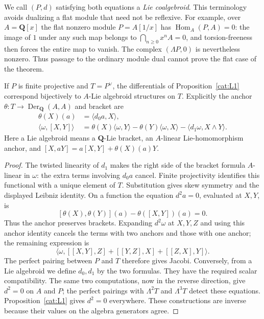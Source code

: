 We call $(P,d)$ satisfying both equations a \emph{Lie coalgebroid}.
This terminology avoids dualizing a flat module that need not be reflexive.
For example, over $A=\mathbf Q[x]$ the flat nonzero module $P=A[1/x]$
has $\operatorname{Hom}_A(P,A)=0$: the image of $1$ under any such map
belongs to $\bigcap_{n\geq0}x^nA=0$, and torsion-freeness then forces the
entire map to vanish.  The complex $(\Lambda P,0)$ is nevertheless
nonzero.  Thus passage to the ordinary module dual cannot prove the
flat case of the theorem.

\begin{proposition}\label{cat:L2}
If $P$ is finite projective and $T=P^\vee$, the differentials of
Proposition~\ref{cat:L1} correspond bijectively to $A$-Lie algebroid
structures on $T$.  Explicitly the anchor
$\theta:T\to\operatorname{Der}_{\mathbf Q}(A,A)$ and bracket are
\begin{align*}
 \theta(X)(a)&=\langle d_0a,X\rangle,\\
 \langle\omega,[X,Y]\rangle
 &=\theta(X)\langle\omega,Y\rangle
   -\theta(Y)\langle\omega,X\rangle
   -\langle d_1\omega,X\wedge Y\rangle.
\end{align*}
Here a Lie algebroid means a $\mathbf Q$-Lie bracket, an $A$-linear
Lie-homomorphism anchor, and
$[X,aY]=a[X,Y]+\theta(X)(a)Y$.
\end{proposition}
\begin{proof}
The twisted linearity of $d_1$ makes the right side of the bracket
formula $A$-linear in $\omega$: the extra terms involving $d_0a$ cancel.
Finite projectivity identifies this functional with a unique element of
$T$.  Substitution gives skew symmetry and the displayed Leibniz
identity.  On a function the equation $d^2a=0$, evaluated at $X,Y$, is
\[
 [\theta(X),\theta(Y)](a)-\theta([X,Y])(a)=0.
\]
Thus the anchor preserves brackets.  Expanding $d^2\omega$ at $X,Y,Z$
and using this anchor identity cancels the terms with two anchors and
those with one anchor; the remaining expression is
\[
 \langle\omega,
 [[X,Y],Z]+[[Y,Z],X]+[[Z,X],Y]\rangle.
\]
The perfect pairing between $P$ and $T$ therefore gives Jacobi.
Conversely, from a Lie algebroid we define $d_0,d_1$ by the two formulas.
They have the required scalar compatibility.  The same two computations,
now in the reverse direction, give $d^2=0$ on $A$ and $P$; the perfect
pairings with $\Lambda^2T$ and $\Lambda^3T$ detect these equations.
Proposition~\ref{cat:L1} gives $d^2=0$ everywhere.  These constructions
are inverse because their values on the algebra generators agree.
\end{proof}

